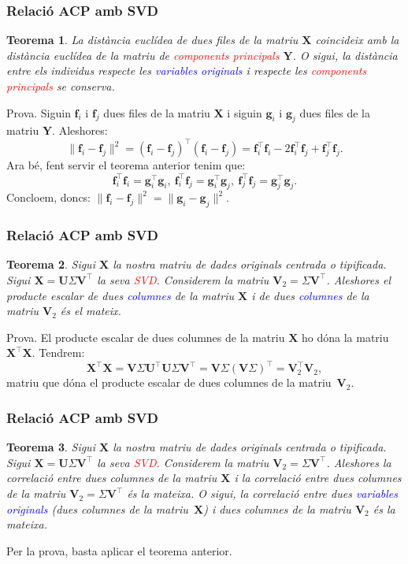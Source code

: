 \documentclass[12pt,t]{beamer}
\newcommand{\red}[1]{\textcolor{red}{#1}}
\newcommand{\blue}[1]{\textcolor{blue}{#1}}
\theoremstyle{plain}
\newtheorem{teorema}{Teorema}
\theoremstyle{definition}
\begin{document}
\begin{frame}
\frametitle{Relació ACP amb SVD}
\begin{teorema}
La distància euclídea de dues files de la matriu $\mathbf{X}$ coincideix amb la distància euclídea de la matriu de \red{components principals} $\mathbf{Y}$. O sigui, la distància entre els individus respecte les \blue{variables originals} i respecte les \red{components principals} se conserva.
\end{teorema}
{\footnotesize Prova. Siguin $\mathbf{f}_i$ i $\mathbf{f}_j$ dues files de la matriu $\mathbf{X}$ i siguin $\mathbf{g}_i$ i $\mathbf{g}_j$ dues files de la matriu $\mathbf{Y}$. Aleshores:
\[
\|\mathbf{f}_i-\mathbf{f}_j\|^2 = (\mathbf{f}_i-\mathbf{f}_j)^\top (\mathbf{f}_i-\mathbf{f}_j)=\mathbf{f}_i^\top\mathbf{f}_i-2\mathbf{f}_i^\top\mathbf{f}_j+\mathbf{f}_j^\top\mathbf{f}_j.
\]
Ara bé, fent servir el teorema anterior tenim que:
\[
\mathbf{f}_i^\top\mathbf{f}_i=\mathbf{g}_i^\top\mathbf{g}_i,\ \mathbf{f}_i^\top\mathbf{f}_j=\mathbf{g}_i^\top\mathbf{g}_j, \ \mathbf{f}_j^\top\mathbf{f}_j=\mathbf{g}_j^\top\mathbf{g}_j.
\]
Concloem, doncs:
\(
\|\mathbf{f}_i-\mathbf{f}_j\|^2=\|\mathbf{g}_i-\mathbf{g}_j\|^2.
\)
}
\end{frame}


\begin{frame}
\frametitle{Relació ACP amb SVD}
\begin{teorema}
Sigui $\mathbf{X}$ la nostra matriu de dades originals centrada o tipificada. Sigui $\mathbf{X}=\mathbf{U}\Sigma\mathbf{V}^\top$ la seva \red{SVD}. Considerem la matriu $\mathbf{V}_2 = \Sigma\mathbf{V}^\top$. Aleshores el producte escalar de dues \blue{columnes} de la matriu $\mathbf{X}$ i de dues \blue{columnes} de la matriu $\mathbf{V}_2$ és el mateix.
\end{teorema}
{\footnotesize Prova.
El producte escalar de dues columnes de la matriu $\mathbf{X}$ ho dóna la matriu $\mathbf{X}^\top\mathbf{X}$. Tendrem:
\[
\mathbf{X}^\top\mathbf{X}=\mathbf{V}\Sigma\mathbf{U}^\top\mathbf{U}\Sigma\mathbf{V}^\top = \mathbf{V}\Sigma (\mathbf{V}\Sigma)^\top = \mathbf{V}_2^\top\mathbf{V}_2,
\]
matriu que dóna el producte escalar de dues columnes de la matriu~$\mathbf{V}_2$.
}
\end{frame}


\begin{frame}
\frametitle{Relació ACP amb SVD}
\begin{teorema}
Sigui $\mathbf{X}$ la nostra matriu de dades originals centrada o tipificada. Sigui $\mathbf{X}=\mathbf{U}\Sigma\mathbf{V}^\top$ la seva \red{SVD}. Considerem la matriu $\mathbf{V}_2 = \Sigma\mathbf{V}^\top$. Aleshores la correlació entre dues columnes de la matriu $\mathbf{X}$ i la correlació entre dues columnes de la matriu $\mathbf{V}_2 = \Sigma\mathbf{V}^\top$ és la mateixa.
O sigui, la correlació entre dues \blue{variables originals} (dues columnes de la matriu~$\mathbf{X}$) i dues columnes de la matriu $\mathbf{V}_2$ és la mateixa.
\end{teorema}

Per la prova, basta aplicar el teorema anterior. 
\end{frame}
\end{document}
